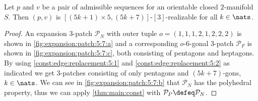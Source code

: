\begin{theorem}
  Let $p$ and $v$ be a pair of admissible sequences for an orientable closed $2$-manifold $S$. Then $(p, v)$ is $[(5k + 1) \times 5, (5k+7)]$-$[3]$-realizable for all $k \in \nats$.
  \begin{proof}
    An expansion $3$-patch $\mathcal{P}_N$ with outer tuple $o = (1, 1, 1, 2, 1, 2, 2, 2)$ is shown in \autoref{fig:expansion:patch:5:7:a} and a corresponding $o$-$6$-gonal $3$-patch $\mathcal{P}_F$ is shown in \autoref{fig:expansion:patch:5:7:c}, both consisting of pentagons and heptagons. By using \autoref{const:edge:replacement:5:1} and \autoref{const:edge:replacement:5:2} as indicated we get $3$-patches consisting of only pentagons and $(5k+7)$-gons, $k \in \nats$. We can see in \autoref{fig:expansion:patch:5:7:b} that $\mathcal{P}_N$ has the polyhedral property, thus we can apply \autoref{thm:main:const} with $\mathcal{P}_P \defeq \mathcal{P}_N$.
  \end{proof}%
\end{theorem}%
